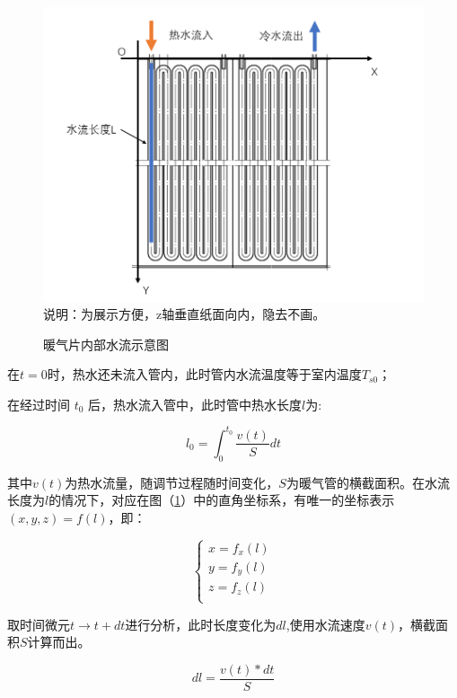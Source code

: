 \documentclass{my_paper}
\begin{document}
\begin {figure}[h]
\centering %
\includegraphics[width=\textwidth]{nuanqipian.png}
说明：为展示方便，z轴垂直纸面向内，隐去不画。
\caption{暖气片内部水流示意图} %
\label{nuanqipian}
\end {figure}

在$ t=0 $时，热水还未流入管内，此时管内水流温度等于室内温度$ T_{s0} $；

在经过时间 $t_0$ 后，热水流入管中，此时管中热水长度$l$为:

\begin{equation}
l_0 = \int^{t_0}_{0}\frac{v(t)}{S}dt
\end{equation}

其中$ v(t) $为热水流量，随调节过程随时间变化，$ S $为暖气管的横截面积。在水流长度为$ l $的情况下，对应在图（\ref{nuanqipian}）中的直角坐标系，有唯一的坐标表示$(x,y,z)=f(l)$，即：

\begin{equation}
\begin{cases}
    x = f_x(l)\\
    y = f_y(l)\\
    z = f_z(l)\\
\end{cases}
\end{equation}

取时间微元$ t\to t+dt $进行分析，此时长度变化为$dl$,使用水流速度$v(t)$，横截面积$S$计算而出。

\begin{equation}
    dl = \frac{v(t)*dt}{S}
\end{equation}
\end{document}
